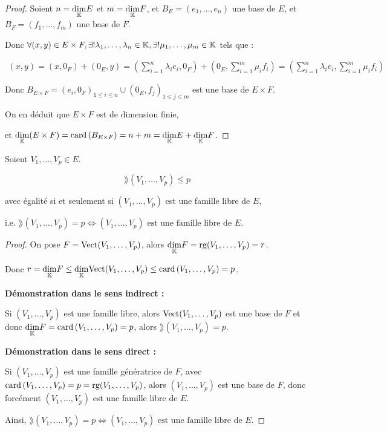 \documentclass[12pt,a4paper]{report}
\begin{document}
\begin{proof}
    Soient $n = \underset{\mathbb{K}}\dim E$ et $m = \underset{\mathbb{K}}\dim F$, et $B_E = (e_1,\dots,e_n)$ une base de $E$, et $B_F = (f_1,\dots,f_m)$ une base de $F$.

    Donc $\forall (x,y) \in E\times F, \exists ! \lambda_1,\dots,\lambda_n \in \mathbb{K}, \exists ! \mu_1,\dots,\mu_m \in \mathbb{K}$ tels que :
    
    \begin{align*}
        (x,y) = (x,0_F) + (0_E,y) = (\sum_{i=1}^n \lambda_i e_i,0_F) + (0_E, \sum_{i=1}^m \mu_i f_i) = (\sum_{i=1}^n \lambda_i e_i, \sum_{i=1}^m \mu_i f_i)
    \end{align*}
    
    Donc $B_{E\times F} = (e_i,0_F)_{1\le i\le n} \cup (0_E,f_j)_{1\le j\le m}$ est une base de $E\times F$.

    On en déduit que $E\times F$ est de dimension finie,
    
    et $\underset{\mathbb{K}}\dim (E\times F) = \mathrm{card}\left(B_{E\times F}\right) = n + m = \underset{\mathbb{K}}\dim E + \underset{\mathbb{K}}\dim F$.
\end{proof}

\begin{property}
    Soient $V_1,\dots,V_p \in E$.
    
    $$\rang(V_1,\dots,V_p) \le p$$
    
    avec égalité si et seulement si $(V_1,\dots,V_p)$ est une famille libre de $E$,
    
    i.e. $\rang(V_1,\dots,V_p) = p \iff (V_1,\dots,V_p) \text{ est une famille libre de } E$.

    \label{prop:rang_famille_libre_iff_rang_egal_card}
\end{property}

\begin{proof}
    On pose $F = \mathrm{Vect}(V_1,\dots,V_p)$, alors $\underset{\mathbb{K}}\dim F = \mathrm{rg}(V_1,\dots,V_p) = r$.

    Donc $r = \underset{\mathbb{K}}\dim F \le \underset{\mathbb{K}}\dim \mathrm{Vect}(V_1,\dots,V_p) \le \mathrm{card}\left(V_1,\dots,V_p\right) = p$.

    \textbf{Démonstration dans le sens indirect : }

    Si $(V_1,\dots,V_p)$ est une famille libre, alors $\mathrm{Vect}(V_1,\dots,V_p)$ est une base de $F$ et donc $\underset{\mathbb{K}}\dim F = \mathrm{card}\left(V_1,\dots,V_p\right) = p$, alors $\rang(V_1,\dots,V_p) = p$.

    \textbf{Démonstration dans le sens direct : }

    Si $(V_1,\dots,V_p)$ est une famille génératrice de $F$, avec $\mathrm{card}\left(V_1,\dots,V_p\right) = p = \mathrm{rg}(V_1,\dots,V_p)$, alors $(V_1,\dots,V_p)$ est une base de $F$, donc forcément $(V_1,\dots,V_p)$ est une famille libre de $E$.

    Ainsi, $\rang(V_1,\dots,V_p) = p \iff (V_1,\dots,V_p) \text{ est une famille libre de } E$.
\end{proof}
\end{document}
